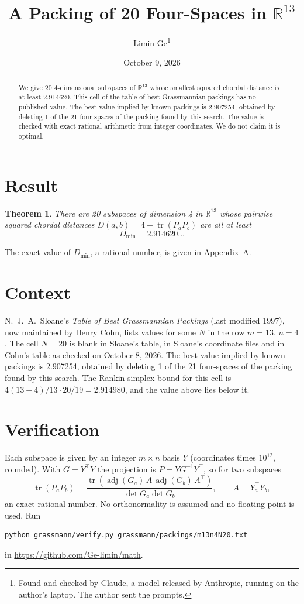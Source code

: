 \documentclass[11pt,a4paper]{article}
\title{A Packing of 20 Four-Spaces in $\mathbb{R}^{13}$}
\author{Limin Ge\thanks{Found and checked by Claude, a model released by Anthropic, running on the author's laptop. The author sent the prompts.}}
\date{October 9, 2026}
\newtheorem*{theorem}{Theorem}
\begin{document}
\maketitle
\begin{abstract}
We give 20 4-dimensional subspaces of $\mathbb{R}^{13}$ whose smallest squared chordal distance is at least 2.914620. This cell of the table of best Grassmannian packings has no published value. The best value implied by known packings is 2.907254, obtained by deleting 1 of the 21 four-spaces of the packing found by this search. The value is checked with exact rational arithmetic from integer coordinates. We do not claim it is optimal.
\end{abstract}

\section{Result}
\begin{theorem}
There are 20 subspaces of dimension 4 in $\mathbb{R}^{13}$ whose pairwise squared chordal distances $D(a,b) = 4 - \operatorname{tr}(P_aP_b)$ are all at least
\[ D_{\min} = 2.914620\ldots \]
\end{theorem}
The exact value of $D_{\min}$, a rational number, is given in Appendix~A.


\section{Context}
N.~J.~A.~Sloane's \emph{Table of Best Grassmannian Packings} (last modified 1997), now maintained by Henry Cohn, lists values for some $N$ in the row $m=13$, $n=4$. The cell $N=20$ is blank in Sloane's table, in Sloane's coordinate files and in Cohn's table as checked on October 8, 2026. The best value implied by known packings is 2.907254, obtained by deleting 1 of the 21 four-spaces of the packing found by this search. The Rankin simplex bound for this cell is $4(13-4)/13\cdot 20/19 = 2.914980$, and the value above lies below it.


\section{Verification}
Each subspace is given by an integer $m\times n$ basis $Y$ (coordinates times $10^{12}$, rounded). With $G=Y^\top Y$ the projection is $P=YG^{-1}Y^\top$, so for two subspaces
\[ \operatorname{tr}(P_aP_b)=\frac{\operatorname{tr}(\operatorname{adj}(G_a)\,A\,\operatorname{adj}(G_b)\,A^\top)}{\det G_a\det G_b},\qquad A=Y_a^\top Y_b, \]
an exact rational number. No orthonormality is assumed and no floating point is used. Run
\begin{verbatim}
python grassmann/verify.py grassmann/packings/m13n4N20.txt
\end{verbatim}
in \url{https://github.com/Ge-limin/math}.
\end{document}
